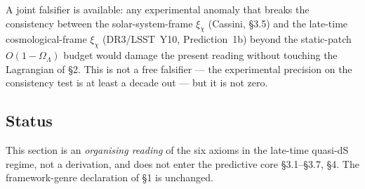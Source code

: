A joint falsifier is available: any experimental anomaly that breaks
the consistency between the solar-system-frame $\xi_\chi$ (Cassini,
\S3.5) and the late-time cosmological-frame $\xi_\chi$
(DR3/LSST~Y10, Prediction~1b) beyond the static-patch
$O(1-\Omega_\Lambda)$ budget would damage the present reading without
touching the Lagrangian of \S2. This is not a free falsifier --- the
experimental precision on the consistency test is at least a decade
out --- but it is not zero.

\subsection*{Status}

This section is an \emph{organising reading} of the six axioms in the
late-time quasi-dS regime, not a derivation, and does not enter the
predictive core \S3.1--\S3.7, \S4. The framework-genre declaration of
\S1 is unchanged.



